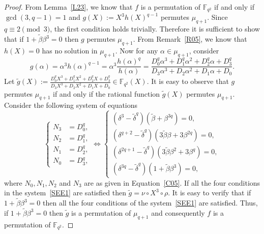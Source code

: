 \documentclass[10pt,a4paper]{amsart}
\newcommand{\F}{\mathbb F}
\begin{document}
\begin{proof}
From Lemma~\ref{L23}, we know that $f$ is a permutation of $\F_{q^2}$ if and only if $\gcd(3,q-1)=1$ and $g(X):=X^3h(X)^{q-1}$ permutes $\mu_{q+1}$. Since $q\equiv 2 \pmod 3$, the first condition holds trivially. Therefore it is sufficient to show that if $1+{\tilde \beta}\beta^3=0$ then $g$ permutes $\mu_{q+1}$. From Remark~\ref{R05}, we know that $h(X)=0$ has no solution in $\mu_{q+1}$. Now for any $\alpha \in \mu_{q+1}$, consider
 \[
  g(\alpha)= \alpha^3h(\alpha)^{q-1}=\alpha^3\frac{h(\alpha)^q}{h(\alpha)}= \frac{D_0^q\alpha^3+D_1^q\alpha^2 +D_2^q\alpha+D_3^q}{D_3\alpha^3+D_2\alpha^2 +D_1\alpha+D_0}.
 \]
Let $\displaystyle {\tilde g}(X):= \frac{D_0^qX^3+D_1^qX^2 +D_2^qX+D_3^q}{D_3X^3+D_2X^2 +D_1X+D_0} \in \F_{q^2}(X)$. It is easy to observe that $g$ permutes $\mu_{q+1}$ if and only if the rational function ${\tilde g}(X)$ permutes $\mu_{q+1}$. Consider the following system of equations
\begin{equation} \label{SEE1}
  \begin{cases}
   N_3 &= D_0^q,\\
   N_2 &= D_1^q,\\
   N_1 &= D_2^q,\\
   N_0 &= D_3^q,
  \end{cases}
  \iff
  \begin{cases}
   (\delta^3-{\tilde \delta}^q)({\tilde \beta} +\beta^{3q})=0 ,\\
   (\delta^{q+2}-{\tilde \delta}^q)(3{\tilde \beta}\beta +3\beta^{2q})=0,\\
   (\delta^{2q+1}-{\tilde \delta}^q)(3{\tilde \beta}\beta^2+3\beta^q)=0,\\
   (\delta^{3q}-{\tilde \delta}^q)(1+{\tilde \beta}\beta^3)  = 0,
  \end{cases}
 \end{equation}
 where $N_0, N_1, N_2$ and $N_3$ are as given in Equation~\eqref{C05}. If all the four conditions in the system~\eqref{SEE1} are satisfied then ${\tilde g}={\nu} \circ X^3 \circ \rho$. It is easy to verify that if $1+{\tilde \beta}\beta^3=0$ then  all the four conditions of the system~\eqref{SEE1} are satisfied. Thus, if $1+{\tilde \beta}\beta^3=0$ then ${\tilde g}$ is a permutation of $\mu_{q+1}$ and consequently $f$ is a permutation of $\F_{q^2}$.
\end{proof}
\end{document}
